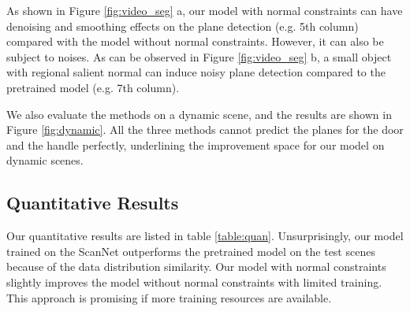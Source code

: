 As shown in Figure \ref{fig:video_seg} a, our model with normal constraints can have denoising and smoothing effects on the plane detection (e.g. 5th column) compared with the model without normal constraints. However, it can also be subject to noises. As can be observed in Figure \ref{fig:video_seg} b, a small object with regional salient normal can induce noisy plane detection compared to the pretrained model (e.g. 7th column).

We also evaluate the methods on a dynamic scene, and the results are shown in Figure \ref{fig:dynamic}. All the three methods cannot predict the planes for the door and the handle perfectly, underlining the improvement space for our model on dynamic scenes.

\subsection{Quantitative Results}
Our quantitative results are listed in table \ref{table:quan}. Unsurprisingly, our model trained on the ScanNet \cite{dai2017scannet} outperforms the pretrained model \cite{jabri2020walk} on the test scenes because of the data distribution similarity. Our model with normal constraints slightly improves the model without normal constraints with limited training. This approach is promising if more training resources are available.
